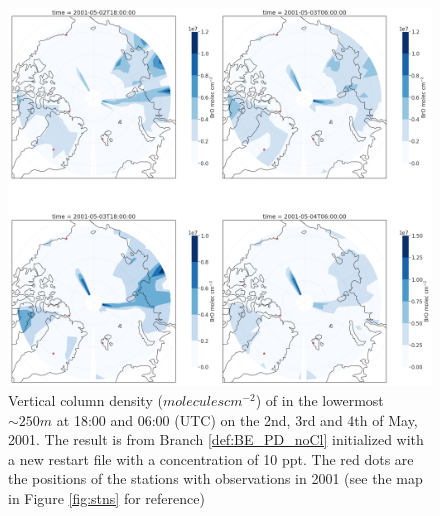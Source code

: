 \begin{figure}[h]
    \centering
    \includegraphics[width=\linewidth]{Chapter6_Results/images/polarBro_newRestart.png}
    \caption{Vertical column density ($molecules cm^{-2}$) of  in the lowermost $\sim 250 m$ at 18:00 and 06:00 (UTC) on the  2nd, 3rd and 4th of May, 2001. The result is from Branch \ref{def:BE_PD_noCl} initialized with a new restart file with a  concentration of 10 ppt. The red dots are the positions of the stations with observations in 2001 (see the map in Figure \ref{fig:stns} for reference)}
    \label{fig:polarBro_newRestart}
\end{figure}